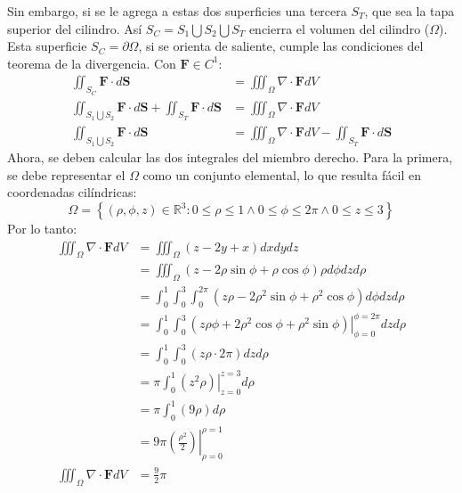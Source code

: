 \begin{solution}
    Sin embargo, si se le agrega a estas dos superficies una tercera $S_T$, que sea la tapa superior del cilindro.
    Así $S_C = S_1 \bigcup S_2 \bigcup S_T$ encierra el volumen del cilindro ($\Omega$). Esta superficie $S_C = \partial\Omega$, si se
    orienta de saliente, cumple las condiciones del teorema de la divergencia. Con $\boldsymbol{F} \in C^1$:
    \begin{align*}
        \iint_{S_C} \boldsymbol{F} \cdot d\boldsymbol{S} &= \iiint_{\Omega} \nabla \cdot \boldsymbol{F} dV\\
        \iint_{S_1 \bigcup S_2} \boldsymbol{F} \cdot d\boldsymbol{S} + \iint_{S_T} \boldsymbol{F} \cdot d\boldsymbol{S}&= \iiint_{\Omega} \nabla \cdot \boldsymbol{F} dV\\
        \iint_{S_1 \bigcup S_2} \boldsymbol{F} \cdot d\boldsymbol{S} &= \iiint_{\Omega} \nabla \cdot \boldsymbol{F} dV - \iint_{S_T} \boldsymbol{F} \cdot d\boldsymbol{S}
    \end{align*}
    Ahora, se deben calcular las dos integrales del miembro derecho. Para la primera, se debe representar el $\Omega$ 
    como un conjunto elemental, lo que resulta fácil en coordenadas cilíndricas:
    \begin{equation*}
    \Omega = \left\{(\rho,\phi,z) \in \mathbb{R}^3: 0\leq\rho\leq1 \land 0\leq\phi\leq2\pi \land 0\leq z \leq 3 \right\}
    \end{equation*}
    Por lo tanto:
    \begin{align*}
        \iiint_{\Omega} \nabla \cdot \boldsymbol{F} dV &= \iiint_{\Omega} \left(z-2y+x\right)dxdydz\\
        &=\iiint_{\Omega} \left(z-2\rho\sin{\phi}+\rho\cos{\phi}\right)\rho d\phi dz d\rho\\
        &=\int_{0}^{1} \int_{0}^{3} \int_{0}^{2\pi} \left(z\rho-2\rho^2\sin{\phi}+\rho^2\cos{\phi}\right) d\phi dz d\rho\\
        &= \int_{0}^{1} \int_{0}^{3}  \left.\left(z\rho\phi+2\rho^2\cos{\phi}+\rho^2\sin{\phi}\right)\right|_{\phi=0}^{\phi=2\pi} dz d\rho\\
        &= \int_{0}^{1} \int_{0}^{3}  \left(z\rho\cdot2\pi\right) dz d\rho\\
        &= \pi\int_{0}^{1}  \left.\left(z^2\rho\right)\right|_{z=0}^{z=3} d\rho\\
        &= \pi\int_{0}^{1}  \left(9\rho\right) d\rho\\
        &= 9\pi \left.\left(\frac{\rho^2}{2}\right)\right|_{\rho=0}^{\rho=1}\\
        \iiint_{\Omega} \nabla \cdot \boldsymbol{F} dV&= \frac{9}{2}\pi

\end{align*}
\end{solution}
